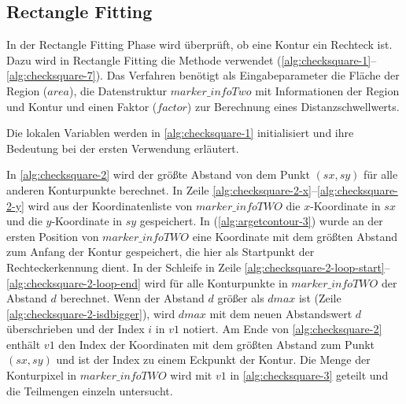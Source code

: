 \clearpage



\clearpage



\clearpage


\clearpage

\subsection{Rectangle Fitting} %
\label{sec:rectangle_fitting}

In der Rectangle Fitting Phase wird überprüft, ob eine Kontur ein Rechteck ist. Dazu wird in Rectangle Fitting die
 Methode  verwendet (\autoref{alg:checksquare-1}--\autoref{alg:checksquare-7}). Das Verfahren
 benötigt als Eingabeparameter die Fläche der Region ($\mathit{area}$), die Datenstruktur $\mathit{marker\_infoTwo}$
 mit Informationen der Region und Kontur und einen Faktor ($\mathit{factor}$) zur Berechnung eines Distanzschwellwerts.



Die lokalen Variablen werden in \autoref{alg:checksquare-1} initialisiert und ihre Bedeutung bei der ersten Verwendung erläutert.



In \autoref{alg:checksquare-2} wird der größte Abstand von dem Punkt $(\mathit{sx},\mathit{sy})$ für alle anderen
 Konturpunkte berechnet. In Zeile \ref{alg:checksquare-2-x}--\ref{alg:checksquare-2-y} wird aus der Koordinatenliste
 von $\mathit{marker\_infoTWO}$ die $x$-Koordinate in $\mathit{sx}$ und die $y$-Koordinate in $\mathit{sy}$
 gespeichert. In  (\autoref{alg:argetcontour-3}) wurde an der ersten Position von
 $\mathit{marker\_infoTWO}$ eine Koordinate mit dem größten Abstand zum Anfang der Kontur gespeichert, die hier als
 Startpunkt der Rechteckerkennung dient. In der Schleife in Zeile
 \ref{alg:checksquare-2-loop-start}--\ref{alg:checksquare-2-loop-end} wird für alle Konturpunkte in
 $\mathit{marker\_infoTWO}$ der Abstand $d$ berechnet. Wenn der Abstand $d$ größer als $\mathit{dmax}$ ist (Zeile
 \ref{alg:checksquare-2-isdbigger}), wird $\mathit{dmax}$ mit dem neuen Abstandswert $d$ überschrieben und der Index
 $i$ in $\mathit{v1}$ notiert. Am Ende von \autoref{alg:checksquare-2} enthält $\mathit{v1}$ den Index der Koordinaten
 mit dem größten Abstand zum Punkt $(\mathit{sx},\mathit{sy})$ und ist der Index zu einem Eckpunkt der Kontur. Die
 Menge der Konturpixel in $\mathit{marker\_infoTWO}$ wird mit $\mathit{v1}$ in \autoref{alg:checksquare-3} geteilt und
 die Teilmengen einzeln untersucht.

